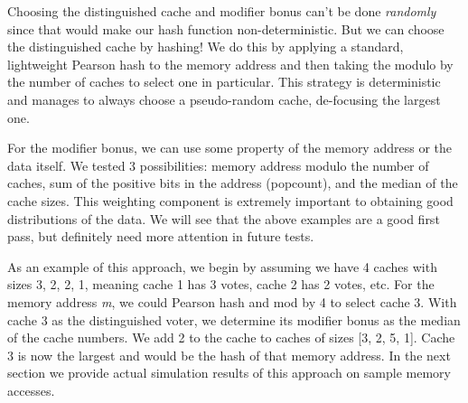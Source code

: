 Choosing the distinguished cache and modifier bonus can't be done
\textit{randomly} since that would make our hash function non-deterministic. But
we can choose the distinguished cache by hashing! We do this by applying a
standard, lightweight Pearson hash to the memory address and then taking the
modulo by the number of caches to select one in particular. This strategy is
deterministic and manages to always choose a pseudo-random cache, de-focusing
the largest one.

For the modifier bonus, we can use some property of the memory address or the
data itself. We tested 3 possibilities: memory address modulo the number of
caches, sum of the positive bits in the address (popcount), and the median of
the cache sizes. This weighting component is extremely important to obtaining
good distributions of the data. We will see that the above examples are a good
first pass, but definitely need more attention in future tests.  

As an example of this approach, we begin by assuming we have 4 caches with sizes
3, 2, 2, 1, meaning cache 1 has 3 votes, cache 2 has 2 votes, etc. For the
memory address \textit{m}, we could Pearson hash and mod by 4 to select cache 3.
With cache 3 as the distinguished voter, we determine its modifier bonus as the
median of the cache numbers.  We add 2 to the cache to caches of sizes [3, 2, 5,
  1].  Cache 3 is now the largest and would be the hash of that memory
address. In the next section we provide actual simulation results of this
approach on sample memory accesses.

